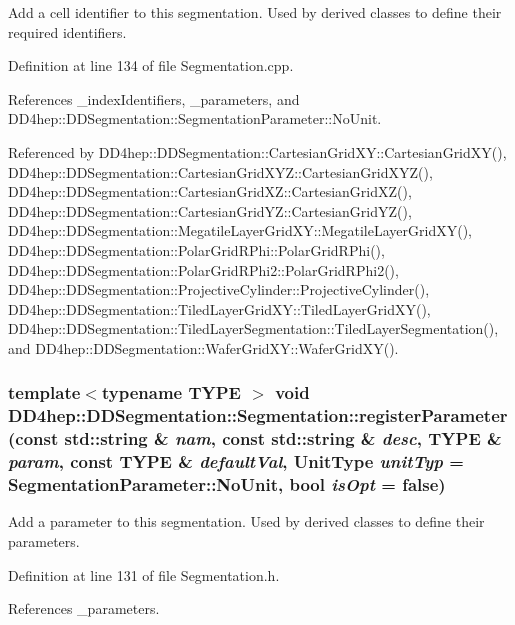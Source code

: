 Add a cell identifier to this segmentation. Used by derived classes to define their required identifiers. 

Definition at line 134 of file Segmentation.cpp.

References \_\-indexIdentifiers, \_\-parameters, and DD4hep::DDSegmentation::SegmentationParameter::NoUnit.

Referenced by DD4hep::DDSegmentation::CartesianGridXY::CartesianGridXY(), DD4hep::DDSegmentation::CartesianGridXYZ::CartesianGridXYZ(), DD4hep::DDSegmentation::CartesianGridXZ::CartesianGridXZ(), DD4hep::DDSegmentation::CartesianGridYZ::CartesianGridYZ(), DD4hep::DDSegmentation::MegatileLayerGridXY::MegatileLayerGridXY(), DD4hep::DDSegmentation::PolarGridRPhi::PolarGridRPhi(), DD4hep::DDSegmentation::PolarGridRPhi2::PolarGridRPhi2(), DD4hep::DDSegmentation::ProjectiveCylinder::ProjectiveCylinder(), DD4hep::DDSegmentation::TiledLayerGridXY::TiledLayerGridXY(), DD4hep::DDSegmentation::TiledLayerSegmentation::TiledLayerSegmentation(), and DD4hep::DDSegmentation::WaferGridXY::WaferGridXY().\hypertarget{class_d_d4hep_1_1_d_d_segmentation_1_1_segmentation_a7f7f6557bb76cf4726b09a4199922f97}{
\subsubsection[{registerParameter}]{\setlength{\rightskip}{0pt plus 5cm}template$<$typename TYPE $>$ void DD4hep::DDSegmentation::Segmentation::registerParameter (const std::string \& {\em nam}, \/  const std::string \& {\em desc}, \/  TYPE \& {\em param}, \/  const TYPE \& {\em defaultVal}, \/  {\bf UnitType} {\em unitTyp} = {\ttfamily SegmentationParameter::NoUnit}, \/  bool {\em isOpt} = {\ttfamily false})}}
\label{class_d_d4hep_1_1_d_d_segmentation_1_1_segmentation_a7f7f6557bb76cf4726b09a4199922f97}


Add a parameter to this segmentation. Used by derived classes to define their parameters. 

Definition at line 131 of file Segmentation.h.

References \_\-parameters.

